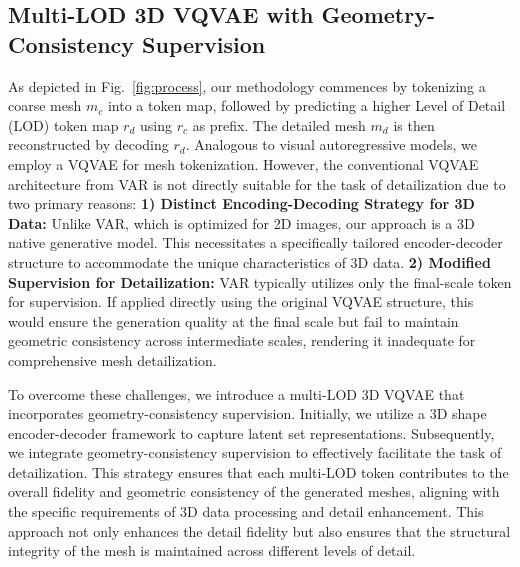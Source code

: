 \subsection{Multi-LOD 3D VQVAE with Geometry-Consistency Supervision}
\label{sec:vqvae}
As depicted in Fig.~\ref{fig:process}, our methodology commences by tokenizing a coarse mesh $m_c$ into a token map, followed by predicting a higher Level of Detail (LOD) token map $r_{d}$ using $r_c$ as prefix. The detailed mesh $m_{d}$ is then reconstructed by decoding  $r_{d}$. Analogous to visual autoregressive models\cite{var}, we employ a VQVAE for mesh tokenization. However, the conventional VQVAE architecture from VAR is not directly suitable for the task of detailization due to two primary reasons: \textbf{1) Distinct Encoding-Decoding Strategy for 3D Data:} Unlike VAR, which is optimized for 2D images, our approach is a 3D native generative model. This necessitates a specifically tailored encoder-decoder structure to accommodate the unique characteristics of 3D data. \textbf{2) Modified Supervision for Detailization:} VAR typically utilizes only the final-scale token for supervision. If applied directly using the original VQVAE structure, this would ensure the generation quality at the final scale but fail to maintain geometric consistency across intermediate scales, rendering it inadequate for comprehensive mesh detailization.

To overcome these challenges, we introduce a multi-LOD 3D VQVAE that incorporates geometry-consistency supervision. Initially, we utilize a 3D shape encoder-decoder framework to capture latent set representations. Subsequently, we integrate geometry-consistency supervision to effectively facilitate the task of detailization. This strategy ensures that each multi-LOD token contributes to the overall fidelity and geometric consistency of the generated meshes, aligning with the specific requirements of 3D data processing and detail enhancement. This approach not only enhances the detail fidelity but also ensures that the structural integrity of the mesh is maintained across different levels of detail.

